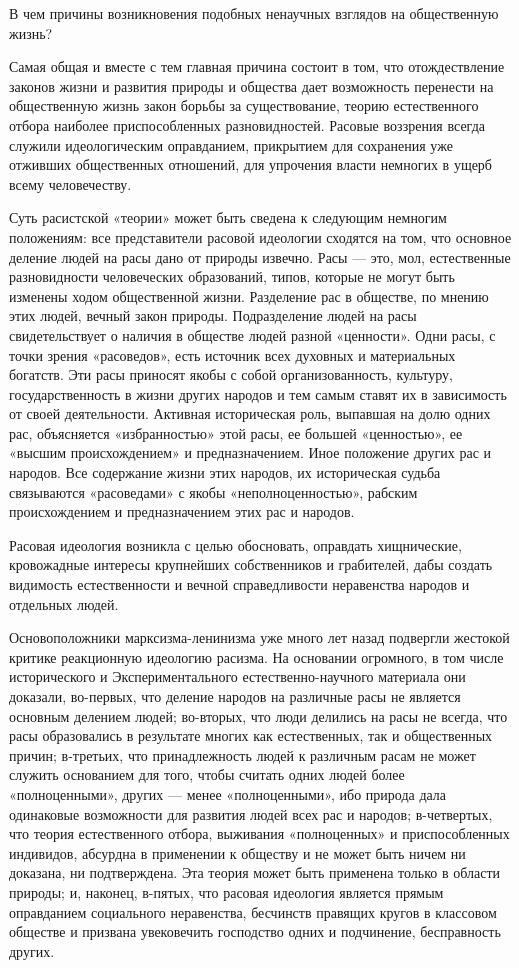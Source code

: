 \documentclass[12pt, a4paper, openany]{book}
\begin{document}
В чем причины возникновения подобных ненаучных взглядов на общественную жизнь?

Самая общая и вместе с тем главная причина состоит в том, что отождествление законов жизни и развития природы и общества дает возможность перенести на общественную жизнь закон борьбы за существование, теорию естественного отбора наиболее приспособленных разновидностей. Расовые воззрения всегда служили идеологическим оправданием, прикрытием для сохранения уже отживших общественных отношений, для упрочения власти немногих в ущерб всему человечеству.

Суть расистской «теории» может быть сведена к следующим немногим положениям: все представители расовой идеологии сходятся на том, что основное деление людей на расы дано от природы извечно. Расы — это, мол, естественные разновидности человеческих образований, типов, которые не могут быть изменены ходом общественной жизни. Разделение рас в обществе, по мнению этих людей, вечный закон природы. Подразделение людей на расы свидетельствует о наличия в обществе людей разной «ценности». Одни расы, с точки зрения «расоведов», есть источник всех духовных и материальных богатств. Эти расы приносят якобы с собой организованность, культуру, государственность в жизни других народов и тем самым ставят их в зависимость от своей деятельности. Активная историческая роль, выпавшая на долю одних рас, объясняется «избранностью» этой расы, ее большей «ценностью», ее «высшим происхождением» и предназначением. Иное положение других рас и народов. Все содержание жизни этих народов, их историческая судьба связываются «расоведами» с якобы «неполноценностью», рабским происхождением и предназначением этих рас и народов.

Расовая идеология возникла с целью обосновать, оправдать хищнические, кровожадные интересы крупнейших собственников и грабителей, дабы создать видимость естественности и вечной справедливости неравенства народов и отдельных людей.

Основоположники марксизма-ленинизма уже много лет назад подвергли жестокой критике реакционную идеологию расизма. На основании огромного, в том числе исторического и Экспериментального естественно-научного материала они доказали, во-первых, что деление народов на различные расы не является основным делением людей; во-вторых, что люди делились на расы не всегда, что расы образовались в результате многих как естественных, так и общественных причин; в-третьих, что принадлежность людей к различным расам не может служить основанием для того, чтобы считать одних людей более «полноценными», других — менее «полноценными», ибо природа дала одинаковые возможности для развития людей всех рас и народов; в-четвертых, что теория естественного отбора, выживания «полноценных» и приспособленных индивидов, абсурдна в применении к обществу и не может быть ничем ни доказана, ни подтверждена. Эта теория может быть применена только в области природы; и, наконец, в-пятых, что расовая идеология является прямым оправданием социального неравенства, бесчинств правящих кругов в классовом обществе и призвана увековечить господство одних и подчинение, бесправность других.
\end{document}
